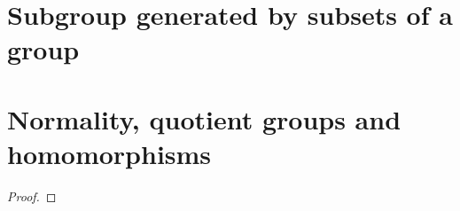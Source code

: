 \documentclass[11pt,a4paper]{article}
\begin{document}
\def\contador{Lesson 7}



\section{Subgroup generated by subsets of a group}

\begin{prop}
    
\end{prop}



\begin{defi}
    
\end{defi}



\begin{rem}
    
\end{rem}


\begin{defi}
    
\end{defi}


\begin{prop}
    
\end{prop}


\begin{rem}
    
\end{rem}

\section{Normality, quotient groups and homomorphisms}


\begin{prop}
    
\end{prop}

\begin{teo}
    
\end{teo}

\begin{defi}
    
\end{defi}

\begin{teo}
    
\end{teo}

\begin{proof}
    
\end{proof}
\end{document}
